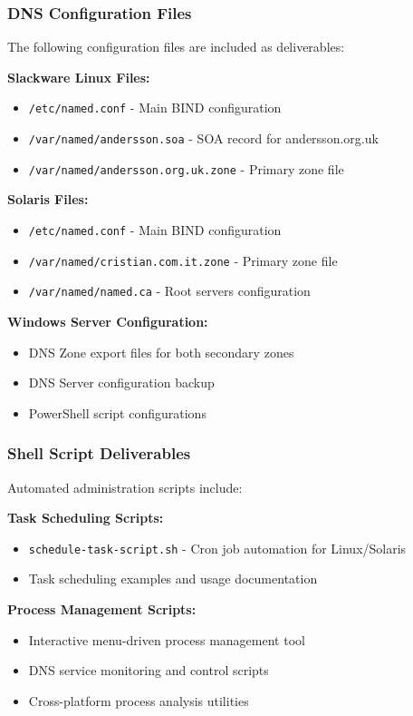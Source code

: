 \documentclass[12pt,a4paper]{article}
\begin{document}
\subsubsection{DNS Configuration Files}
The following configuration files are included as deliverables:

\textbf{Slackware Linux Files:}
\begin{itemize}
    \item \texttt{/etc/named.conf} - Main BIND configuration
    \item \texttt{/var/named/andersson.soa} - SOA record for andersson.org.uk
    \item \texttt{/var/named/andersson.org.uk.zone} - Primary zone file
\end{itemize}

\textbf{Solaris Files:}
\begin{itemize}
    \item \texttt{/etc/named.conf} - Main BIND configuration
    \item \texttt{/var/named/cristian.com.it.zone} - Primary zone file
    \item \texttt{/var/named/named.ca} - Root servers configuration
\end{itemize}

\textbf{Windows Server Configuration:}
\begin{itemize}
    \item DNS Zone export files for both secondary zones
    \item DNS Server configuration backup
    \item PowerShell script configurations
\end{itemize}

\subsubsection{Shell Script Deliverables}
Automated administration scripts include:

\textbf{Task Scheduling Scripts:}
\begin{itemize}
    \item \texttt{schedule-task-script.sh} - Cron job automation for Linux/Solaris
    \item Task scheduling examples and usage documentation
\end{itemize}

\textbf{Process Management Scripts:}
\begin{itemize}
    \item Interactive menu-driven process management tool
    \item DNS service monitoring and control scripts
    \item Cross-platform process analysis utilities
\end{itemize}
\end{document}

